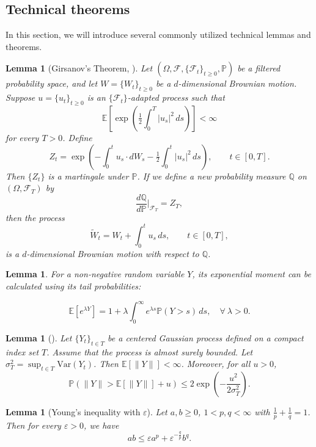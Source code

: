 \documentclass[preprint,12pt]{elsarticle}
\newtheorem{lemma}[theorem]{Lemma}
\theoremstyle{definition}  %
\theoremstyle{plain}  %
\begin{document}
	\subsection{Technical theorems}
	In this section, we will introduce several commonly utilized technical lemmas and theorems.
\begin{lemma}[Girsanov's Theorem, {\cite[Theorem~8.6]{Oksendal2014}}]\label{lem:girsanov}
Let $(\Omega,\mathcal{F},\{\mathcal{F}_t\}_{t\ge0},\mathbb{P})$ be a filtered probability space, and let 
$W=\{W_t\}_{t\ge0}$ be a $d$-dimensional Brownian motion. 
Suppose $u=\{u_t\}_{t\ge0}$ is an $\{\mathcal{F}_t\}$-adapted process such that 
\[
\mathbb{E}\left[\exp\left(\tfrac{1}{2}\int_0^T |u_s|^2\,ds\right)\right] < \infty
\]
for every $T>0$. Define
\[
Z_t = \exp\left(-\int_0^t u_s \cdot dW_s - \tfrac{1}{2}\int_0^t |u_s|^2\,ds\right), 
\qquad t \in [0,T].
\]
Then $\{Z_t\}$ is a martingale under $\mathbb{P}$. If we define a new probability measure 
$\mathbb{Q}$ on $(\Omega,\mathcal{F}_T)$ by
\[
\frac{d\mathbb{Q}}{d\mathbb{P}}\Big|_{\mathcal{F}_T} = Z_T,
\]
then the process
\[
\widetilde{W}_t = W_t + \int_0^t u_s\,ds, \qquad t \in [0,T],
\]
is a $d$-dimensional Brownian motion with respect to $\mathbb{Q}$.
\end{lemma}

	
	\begin{lemma}  \label{nov1}
	    For a non-negative random variable $Y$, its exponential moment can be calculated using its tail probabilities:

\[
\mathbb{E}[e^{\lambda Y}] = 1 + \lambda \int_0^\infty e^{\lambda s} \mathbb{P}(Y > s)  \, ds, \quad \forall \ \lambda>0.
\]
	\end{lemma}

  \begin{lemma}[{\cite[Theorem~5.4.3]{MarcusRosen2006}}]\label{nov2}
        Let $\{Y_t\}_{t\in T}$ be a centered Gaussian process defined on   a compact index set $T$.  Assume that the process is almost surely bounded. Let $\sigma_T^2 = \sup_{t \in T} \mathrm{Var}(Y_t)$.
Then $\mathbb{E}[\|Y\|] < \infty$. Moreover, for all $u > 0$,
\[
\mathbb{P}\left( \|Y\| > \mathbb{E}[\|Y\|] + u \right) \leq 2 \exp\left( -\frac{u^2}{2\sigma_T^2} \right).
\]
    \end{lemma}


\begin{lemma}[Young's inequality with $\varepsilon$]
    Let $a,b \geq 0$, $1 < p,q < \infty$ with $\tfrac{1}{p} + \tfrac{1}{q} = 1$.  
    Then for every $\varepsilon > 0$, we have
    \begin{equation}\label{eq:young}
        ab \leq \varepsilon a^p + \varepsilon^{-\frac{q}{p}} b^q.
    \end{equation}
\end{lemma}
\end{document}

